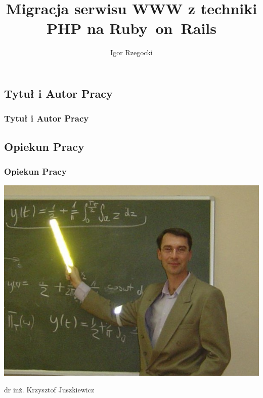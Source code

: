 \documentclass{beamer}
\begin{document}
\subsection{Tytuł i Autor Pracy}
\begin{frame}
  \frametitle{Tytuł i Autor Pracy}
  \title{Migracja serwisu WWW z techniki PHP na Ruby~on~Rails}
  \author{Igor Rzegocki}
  \date{}
  \institute{}
  \titlepage
\end{frame}
\subsection{Opiekun Pracy}
\begin{frame}
  \frametitle{Opiekun Pracy}
  \begin{center}
    \includegraphics[scale=0.35]{juszkiew.jpg}
  \end{center}
  \begin{center}
    dr inż. Krzysztof Juszkiewicz
  \end{center}
\end{frame}
\end{document}
